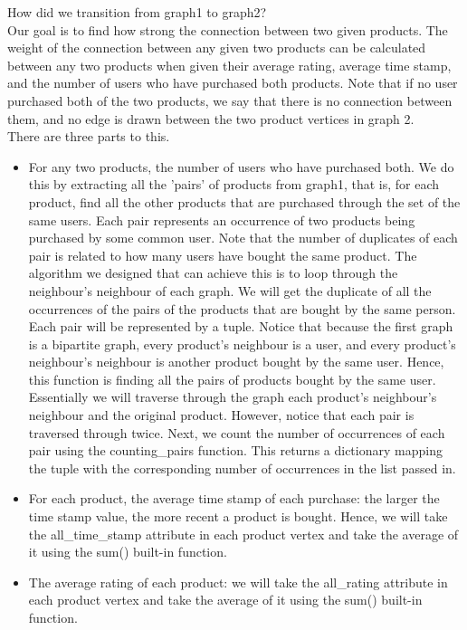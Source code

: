 \documentclass[fontsize=11pt]{article}
\begin{document}
How did we transition from graph1 to graph2? \\
 Our goal is to find how strong the connection between two given products. The weight of the connection between any given two products can be calculated between any two products when given their average rating, average time stamp, and the number of users who have purchased both products. Note that if no user purchased both of the two products, we say that there is no connection between them, and no edge is drawn between the two product vertices in graph 2. \\
There are three parts to this.
\begin{itemize}
    \item For any two products, the number of users who have purchased both. We do this by extracting all the 'pairs' of products from graph1, that is, for each product, find all the other products that are purchased through the set of the same users. Each pair represents an occurrence of two products being purchased by some common user. Note that the number of duplicates of each pair is related to how many users have bought the same product. The algorithm we designed that can achieve this is to loop through the neighbour's neighbour of each graph. We will get the duplicate of all the occurrences of the pairs of the products that are bought by the same person. Each pair will be represented by a tuple. Notice that because the first graph is a bipartite graph, every product's neighbour is a user, and every product's neighbour's neighbour is another product bought by the same user. Hence, this function is finding all the pairs of products bought by the same user. Essentially we will traverse through the graph each product's neighbour's neighbour and the original product. However, notice that each pair is traversed through twice. Next, we count the number of occurrences of each pair using the counting\_pairs function. This returns a dictionary mapping the tuple with the corresponding number of occurrences in the list passed in.
    \item For each product, the average time stamp of each purchase: the larger the time stamp value, the more recent a product is bought. Hence, we will take the all\_time\_stamp attribute in each product vertex and take the average of it using the sum() built-in function.
    \item The average rating of each product: we will take the all\_rating attribute in each product vertex and take the average of it using the sum() built-in function.
\end{itemize}
\end{document}
